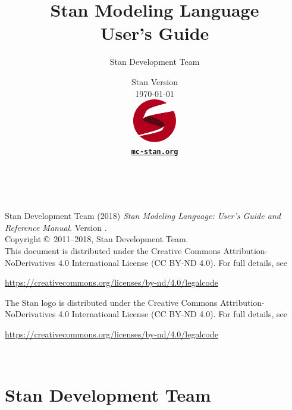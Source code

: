 \title{\Huge\bf Stan Modeling Language \\[4pt] User's Guide}
\author{Stan Development Team}

\date{\vspace*{36pt} Stan Version \stanversion
\\[8pt] {\small \today}
\\[36pt]
{
\vfill
\includegraphics[width=0.75in]{img/stanlogo-main.pdf}}
\\
\vspace*{6pt}
{\bfseries \href{http://mc-stan.org/}{\tt mc-stan.org}}
}
\maketitle

\newpage
\thispagestyle{empty}
\mbox{ }
\vfill
\begin{center}
\begin{minipage}[t]{0.75\textwidth}
\small
Stan Development Team (2018)
{\it Stan Modeling Language: User's Guide and Reference Manual}. Version
\stanversion.
\vspace*{20pt}
\mbox{ }
\\
Copyright \copyright \ 2011--2018, Stan Development Team.
\vspace*{28pt}
\mbox{} \\
This document is distributed under the Creative Commons
Attribution-NoDerivatives 4.0 International License (CC BY-ND 4.0).
For full details, see
\begin{center}
\url{https://creativecommons.org/licenses/by-nd/4.0/legalcode}
\end{center}
The Stan logo is distributed under the Creative Commons
Attribution-NoDerivatives 4.0 International License (CC BY-ND 4.0).
For full details, see
\begin{center}
\url{https://creativecommons.org/licenses/by-nd/4.0/legalcode}
\end{center}
\end{minipage}
\vspace*{24pt}
\mbox{ }
\end{center}

\newpage
\section*{Stan Development Team}

